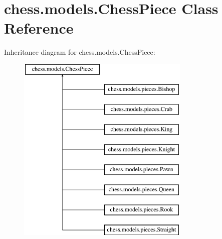 \hypertarget{classchess_1_1models_1_1_chess_piece}{}\section{chess.\+models.\+Chess\+Piece Class Reference}
\label{classchess_1_1models_1_1_chess_piece}
Inheritance diagram for chess.\+models.\+Chess\+Piece\+:\begin{figure}[H]
\begin{center}
\leavevmode
\includegraphics[height=9.000000cm]{classchess_1_1models_1_1_chess_piece}
\end{center}
\end{figure}
